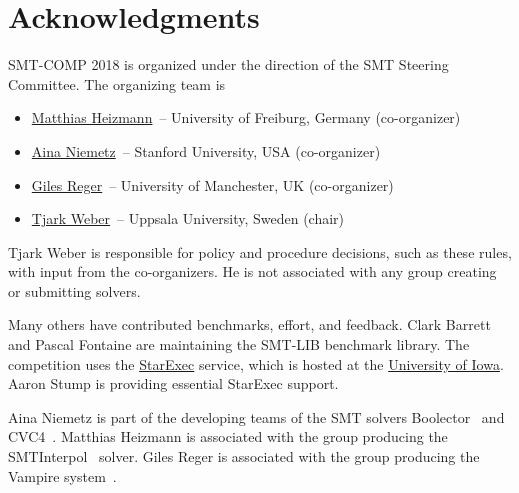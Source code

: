 \documentclass[12pt]{article}
\begin{document}
\section{Acknowledgments}

SMT-COMP 2018 is organized under the direction of the SMT Steering
Committee. The organizing team is
%
\begin{itemize}
\setlength{\itemsep}{0pt}
\item
  \href{https://swt.informatik.uni-freiburg.de/staff/heizmann}{Matthias
    Heizmann}~-- University of Freiburg, Germany (co-organizer)
\item
  \href{http://cs.stanford.edu/people/niemetz}{Aina
    Niemetz}~-- Stanford University, USA (co-organizer)
\item \href{http://www.cs.man.ac.uk/~regerg/}{Giles Reger}~--
  University of Manchester, UK (co-organizer)
\item \href{http://user.it.uu.se/~tjawe125/}{Tjark Weber}~-- Uppsala
  University, Sweden (chair)
\end{itemize}
%
Tjark Weber is responsible for policy and procedure decisions, such as
these rules, with input from the co-organizers. He is not associated
with any group creating or submitting solvers.

Many others have contributed benchmarks, effort, and feedback.  Clark
Barrett and Pascal Fontaine are maintaining the SMT-LIB benchmark
library.  The competition uses the
\href{https://www.starexec.org/}{StarExec} service, which is hosted at
the \href{http://www.cs.uiowa.edu/}{University of Iowa}.  Aaron Stump
is providing essential StarExec support.

%
Aina Niemetz is part of the developing teams of the SMT solvers
Boolector~\cite{boolector}
and CVC4~\cite{cvc4}.
Matthias Heizmann is associated with the group producing the
SMTInterpol~\cite{smtinterpol} solver.
Giles Reger is associated with the group
producing the Vampire system~\cite{vampire}.





\end{document}
